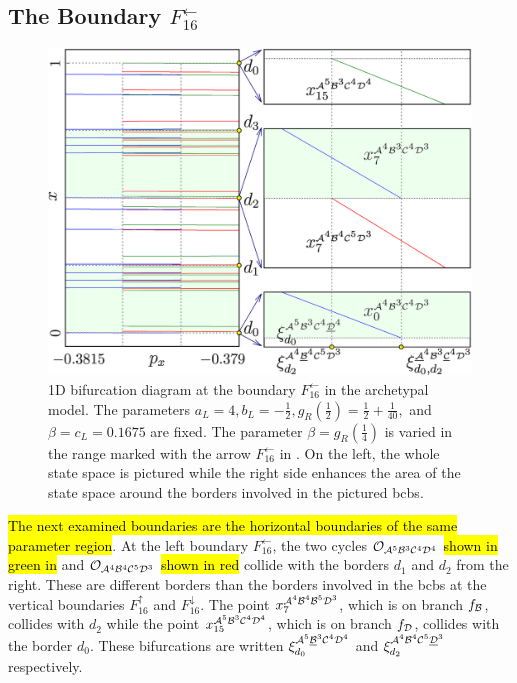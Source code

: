 \subsection{The Boundary $F_{16}^\leftarrow$}
\label{sec:arch.bif.L}

\begin{figure}
	\centering
	\includegraphics[width=.7 \textwidth]{../Figures/6/6.8/result.png}
	\caption[1D bifurcation diagram at the boundary $F_{16}^\leftarrow$ in the archetypal model]{
		1D bifurcation diagram at the boundary $F_{16}^\leftarrow$ in the archetypal model.
		The parameters $a_L = 4, b_L = -\frac{1}{2}, g_R\left(\frac{1}{2}\right) = \frac{1}{2} + \frac{1}{40},$ and $\beta = c_L = 0.1675$ are fixed.
		The parameter $\beta = g_R\left(\frac{1}{4}\right)$ is varied in the range marked with the arrow $F_{16}^\leftarrow$ in .
		On the left, the whole state space is pictured while the right side enhances the area of the state space around the borders involved in the pictured \glspl{bcb}.
	}
	\label{fig:arch.bif.F.left}
\end{figure}

\hl{The next examined boundaries are the horizontal boundaries of the same parameter region}.
At the left boundary $F_{16}^\leftarrow$, the two cycles $\mathcal{O}_{\mathcal{A}^5\mathcal{B}^3\mathcal{C}^4\mathcal{D}^4}$ \hl{shown in green in}  and $\mathcal{O}_{\mathcal{A}^4\mathcal{B}^4\mathcal{C}^5\mathcal{D}^3}$ \hl{shown in red} collide with the borders $d_1$ and $d_2$ from the right.
These are different borders than the borders involved in the \glspl{bcb} at the vertical boundaries $F_{16}^\uparrow$ and $F_{16}^\downarrow$.
The point $x_{7}^{\mathcal{A}^4\mathcal{B}^4\mathcal{B}^5\mathcal{D}^3}$, which is on branch $f_{\mathcal{B}}$, collides with $d_2$ while the point $x_{15}^{\mathcal{A}^5\mathcal{B}^3\mathcal{C}^4\mathcal{D}^4}$, which is on branch $f_{\mathcal{D}}$, collides with the border $d_0$.
These bifurcations are written $\xi_{d_0}^{\mathcal{A}^5\underline{\mathcal{B}}^3\mathcal{C}^4\mathcal{D}^4}$ and $\xi_{d_2}^{\mathcal{A}^4\mathcal{B}^4\mathcal{C}^5\underline{\mathcal{D}}^3}$ respectively.

